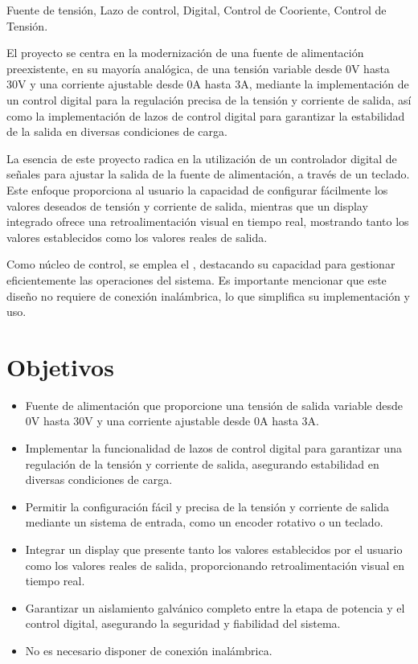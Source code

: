 
\begin{resumen}{Fuente de tensión, Lazo de control, Digital, Control de Cooriente, Control de Tensión.}

El proyecto se centra en la modernización de una fuente de alimentación preexistente, en su mayoría analógica, de una tensión variable desde 0V hasta 30V y una corriente ajustable desde 0A hasta 3A, mediante la implementación de un control digital para la regulación precisa de la tensión y corriente de salida, así como la implementación de lazos de control digital para garantizar la estabilidad de la salida en diversas condiciones de carga. 

La esencia de este proyecto radica en la utilización de un controlador digital de señales para ajustar la salida de la fuente de alimentación, a través de un teclado. Este enfoque proporciona al usuario la capacidad de configurar fácilmente los valores deseados de tensión y corriente de salida, mientras que un display integrado ofrece una retroalimentación visual en tiempo real, mostrando tanto los valores establecidos como los valores reales de salida.

Como núcleo de control, se emplea el , destacando su capacidad para gestionar eficientemente las operaciones del sistema. Es importante mencionar que este diseño no requiere de conexión inalámbrica, lo que simplifica su implementación y uso.\par

\section*{Objetivos}

\begin{itemize}
    \item Fuente de alimentación que proporcione una tensión de salida variable desde 0V hasta 30V y una corriente ajustable desde 0A hasta 3A.
    \item Implementar la funcionalidad de lazos de control digital para garantizar una regulación de la tensión y corriente de salida, asegurando estabilidad en diversas condiciones de carga.
    \item Permitir la configuración fácil y precisa de la tensión y corriente de salida mediante un sistema de entrada, como un encoder rotativo o un teclado.
    \item Integrar un display que presente tanto los valores establecidos por el usuario como los valores reales de salida, proporcionando retroalimentación visual en tiempo real.
    \item Garantizar un aislamiento galvánico completo entre la etapa de potencia y el control digital, asegurando la seguridad y fiabilidad del sistema.
    \item No es necesario disponer de conexión inalámbrica.
\end{itemize}

\end{resumen}
